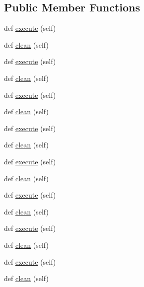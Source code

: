 \subsection*{Public Member Functions}
\begin{DoxyCompactItemize}
\item 
def \hyperlink{classwaflib_1_1_build_1_1_clean_context_a1538df152852c7d957ae1e548eb04e4d}{execute} (self)
\item 
def \hyperlink{classwaflib_1_1_build_1_1_clean_context_a31a23b3781da365c034b7225c4aad31a}{clean} (self)
\item 
def \hyperlink{classwaflib_1_1_build_1_1_clean_context_a1538df152852c7d957ae1e548eb04e4d}{execute} (self)
\item 
def \hyperlink{classwaflib_1_1_build_1_1_clean_context_a31a23b3781da365c034b7225c4aad31a}{clean} (self)
\item 
def \hyperlink{classwaflib_1_1_build_1_1_clean_context_a1538df152852c7d957ae1e548eb04e4d}{execute} (self)
\item 
def \hyperlink{classwaflib_1_1_build_1_1_clean_context_a31a23b3781da365c034b7225c4aad31a}{clean} (self)
\item 
def \hyperlink{classwaflib_1_1_build_1_1_clean_context_a1538df152852c7d957ae1e548eb04e4d}{execute} (self)
\item 
def \hyperlink{classwaflib_1_1_build_1_1_clean_context_a31a23b3781da365c034b7225c4aad31a}{clean} (self)
\item 
def \hyperlink{classwaflib_1_1_build_1_1_clean_context_a1538df152852c7d957ae1e548eb04e4d}{execute} (self)
\item 
def \hyperlink{classwaflib_1_1_build_1_1_clean_context_a31a23b3781da365c034b7225c4aad31a}{clean} (self)
\item 
def \hyperlink{classwaflib_1_1_build_1_1_clean_context_a1538df152852c7d957ae1e548eb04e4d}{execute} (self)
\item 
def \hyperlink{classwaflib_1_1_build_1_1_clean_context_a31a23b3781da365c034b7225c4aad31a}{clean} (self)
\item 
def \hyperlink{classwaflib_1_1_build_1_1_clean_context_a1538df152852c7d957ae1e548eb04e4d}{execute} (self)
\item 
def \hyperlink{classwaflib_1_1_build_1_1_clean_context_a31a23b3781da365c034b7225c4aad31a}{clean} (self)
\item 
def \hyperlink{classwaflib_1_1_build_1_1_clean_context_a1538df152852c7d957ae1e548eb04e4d}{execute} (self)
\item 
def \hyperlink{classwaflib_1_1_build_1_1_clean_context_a31a23b3781da365c034b7225c4aad31a}{clean} (self)

\end{DoxyCompactItemize}

